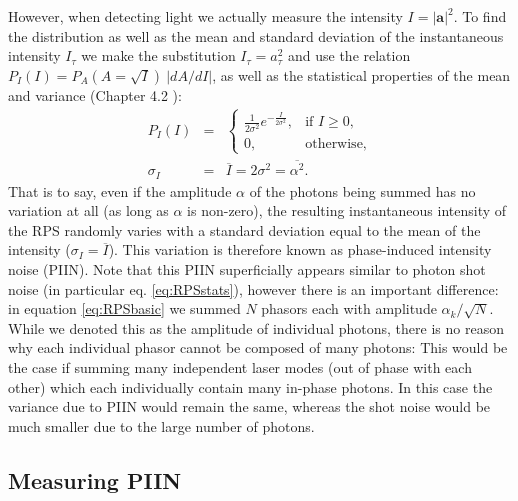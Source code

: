 \documentclass[]{article}
\newcommand*\mean[1]{\overline{#1}}
\begin{document}
    However, when detecting light we actually measure the intensity $I = |\mathbf{a}|^2$. To find the distribution as well as the mean and standard deviation of the instantaneous intensity $I_\tau$ we make the substitution $I_\tau = a_\tau ^2$ and use the relation $P_I(I)=P_A(A=\sqrt{I})\>|dA/dI|$, as well as the statistical properties of the mean and variance (Chapter 4.2 \cite{goodman_statistical_2000}):
    	\begin{eqnarray}
    		P_I(I)&=&
		\begin{cases}
			\frac{1}{2\sigma^2} e^{-\frac{I}{2 \sigma ^2}},& \text{if } I \geq 0,\\
		    0,              & \text{otherwise,}
		\end{cases}
		\\
			\sigma_I &=& \mean{I} = 2\sigma^2 = \mean{\alpha^2}. \label{eq:RPSstats}
		\end{eqnarray}
	That is to say, even if the amplitude $\alpha$ of the photons being summed has no variation at all (as long as $\alpha$ is non-zero), the resulting instantaneous intensity of the RPS randomly varies with a standard deviation equal to the mean of the intensity ($\sigma_I = \mean{I}$). This variation is therefore known as phase-induced intensity noise (PIIN). Note that this PIIN superficially appears similar to photon shot noise (in particular eq. \ref{eq:RPSstats}), however there is an important difference: in equation \ref{eq:RPSbasic} we summed $N$ phasors each with amplitude $\alpha_k /\sqrt{N}$. While we denoted this as the amplitude of individual photons, there is no reason why each individual phasor cannot be composed of many photons: This would be the case if summing many independent laser modes (out of phase with each other) which each individually contain many in-phase photons. In this case the variance due to PIIN would remain the same, whereas the shot noise would be much smaller due to the large number of photons.

\subsection{Measuring PIIN}
	
\end{document}
